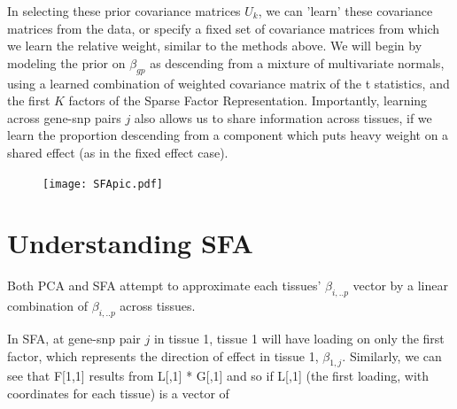 \documentclass[10pt]{article}
\begin{document}
In selecting these prior covariance matrices $U_{k}$, we can 'learn' these covariance matrices from the data, or specify a fixed set of covariance matrices from which we learn the relative weight, similar to the methods above. We will begin by modeling the prior on $\beta_{gp}$ as descending from a mixture of multivariate normals, using a learned combination of weighted covariance matrix of the t statistics, and the first $K$ factors of the Sparse Factor Representation. Importantly, learning across gene-snp pairs $j$ also allows us to share information across tissues, if we learn the proportion descending from a component which puts heavy weight on a shared effect (as in the fixed effect case).




\begin{figure}[h]
    \texttt{[image: SFApic.pdf]}
\end{figure}

\section{Understanding SFA}

Both PCA and SFA attempt to approximate each tissues' $\beta_{i,..p}$ vector by a linear combination of $\beta_{i,..p}$ across tissues. 

In SFA, at gene-snp pair $j$ in tissue 1, tissue 1 will have loading on only the first factor, which represents the direction of effect in tissue 1, $\beta_{1,j}$. Similarly, we can see that F[1,1] results from L[,1] * G[,1] and so if L[,1] (the first loading, with coordinates for each tissue) is a vector of
\begin{pvector}
 [1 0 0 .. R]
 \end{pvector}
 
\end{document}
